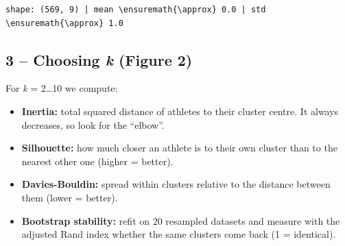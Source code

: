 \documentclass[11pt]{article}
\providecommand{\tightlist}{%
      \setlength{\itemsep}{0pt}\setlength{\parskip}{0pt}}
\begin{document}
    \begin{Verbatim}[commandchars=\\\{\}]
shape: (569, 9) | mean \ensuremath{\approx} 0.0 | std \ensuremath{\approx} 1.0
    \end{Verbatim}

    \subsection{\texorpdfstring{3 -- Choosing \emph{k} (Figure
2)}{3 -- Choosing k (Figure 2)}}\label{choosing-k-figure-2}

For \emph{k} = 2\ldots10 we compute:

\begin{itemize}
\tightlist
\item
  \textbf{Inertia:} total squared distance of athletes to their cluster
  centre. It always decreases, so look for the ``elbow''.
\item
  \textbf{Silhouette:} how much closer an athlete is to their own
  cluster than to the nearest other one (higher = better).
\item
  \textbf{Davies-Bouldin:} spread within clusters relative to the
  distance between them (lower = better).
\item
  \textbf{Bootstrap stability:} refit on 20 resampled datasets and
  measure with the adjusted Rand index whether the same clusters come
  back (1 = identical).
\end{itemize}
\end{document}
